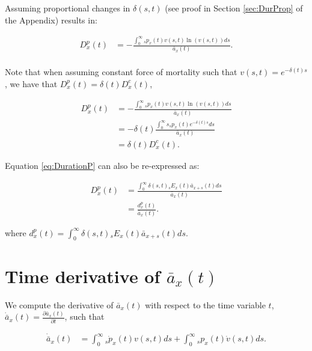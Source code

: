 \documentclass[12pt]{article}
\begin{document}
Assuming proportional changes in $\delta(s,t)$ (see proof in Section \ref{sec:DurProp} of the Appendix) results in: 


\begin{equation}\label{eq:DurationP}
\begin{split}
{D}^{p}_{x}(t) &= -\frac{\int_0^\infty {}_sp_x(t) v(s,t) \ln(v(s,t))ds}{\bar{a}_x(t)}. \\
\end{split}
\end{equation}


Note that when assuming constant force of mortality such that $v(s,t)=e^{-\delta(t)s}$, we have that ${D}^{p}_{x}(t)=\delta(t){D}^{c}_{x}(t)$,


\begin{equation}\label{eq:DurationCP}
\begin{split}
{D}^{p}_{x}(t) &= -\frac{\int_0^\infty {}_sp_x(t) v(s,t) \ln(v(s,t))ds}  {\bar{a}_x(t)} \\
&=- \delta(t)\frac{\int_0^\infty s{}_sp_x(t) e^{-\delta(t)s}  ds}{\bar{a}_x(t)} \\
& = \delta(t){D}^{c}_{x}(t).
\end{split}
\end{equation}

Equation \ref{eq:DurationP} can also be re-expressed as:

\begin{equation}\label{eq:DurationP2}
\begin{split}
{D}^{p}_{x}(t) &= \frac{\int_0^\infty \delta(s,t) {}_sE_x(t) \bar{a}_{x+s}(t)ds} {\bar{a}_x(t)} \\
                 &= \frac{{d}^{p}_{x}(t)}{\bar{a}_x(t)}.
\end{split}
\end{equation}


where ${d}^{p}_{x}(t)=\int_0^\infty \delta(s,t) {}_sE_x(t) \bar{a}_{x+s}(t) ds$. 




\section{Time derivative of $\bar{a}_x(t)$} \label{sec:timderiv}

We compute the derivative of $\bar{a}_x(t)$ with respect to the time variable $t$, $\dot{\bar{a}} _x(t)=\frac{\partial \bar{a}_x(t)}{\partial t}$, such that

\begin{equation}\label{eq:TimeDeriv}
\begin{split}
\dot{\bar{a}} _x(t) &= \int_0^\infty {}_s\dot{p}_x(t) v(s,t)ds +\int_0^\infty {}_sp_x(t) \dot{v}(s,t)ds.\\
\end{split}
\end{equation}
\end{document}
